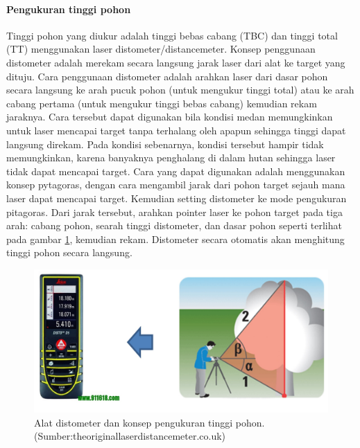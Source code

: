 \documentclass[
  oneside]{book}
\begin{document}
\begin{longtable}[]{@{}
  >{\raggedright\arraybackslash}p{}
  >{\raggedright\arraybackslash}p{}@{}}
\bottomrule()
\end{longtable}

\hypertarget{pengukuran-tinggi-pohon}{%
\paragraph*{Pengukuran tinggi pohon}\label{pengukuran-tinggi-pohon}}

Tinggi pohon yang diukur adalah tinggi bebas cabang (TBC) dan tinggi total (TT) menggunakan laser distometer/distancemeter. Konsep penggunaan distometer adalah merekam secara langsung jarak laser dari alat ke target yang dituju. Cara penggunaan distometer adalah arahkan laser dari dasar pohon secara langsung ke arah pucuk pohon (untuk mengukur tinggi total) atau ke arah cabang pertama (untuk mengukur tinggi bebas cabang) kemudian rekam jaraknya. Cara tersebut dapat digunakan bila kondisi medan memungkinkan untuk laser mencapai target tanpa terhalang oleh apapun sehingga tinggi dapat langsung direkam. Pada kondisi sebenarnya, kondisi tersebut hampir tidak memungkinkan, karena banyaknya penghalang di dalam hutan sehingga laser tidak dapat mencapai target. Cara yang dapat digunakan adalah menggunakan konsep pytagoras, dengan cara mengambil jarak dari pohon target sejauh mana laser dapat mencapai target. Kemudian setting distometer ke mode pengukuran pitagoras. Dari jarak tersebut, arahkan pointer laser ke pohon target pada tiga arah: cabang pohon, searah tinggi distometer, dan dasar pohon seperti terlihat pada gambar \ref{fig:figdst}, kemudian rekam. Distometer secara otomatis akan menghitung tinggi pohon secara langsung.

\begin{figure}

{\centering \includegraphics[width=1\linewidth]{images/dst_ilustration} 

}

\caption{Alat distometer dan konsep pengukuran tinggi pohon. (Sumber:theoriginallaserdistancemeter.co.uk)}\label{fig:figdst}
\end{figure}
\end{document}
